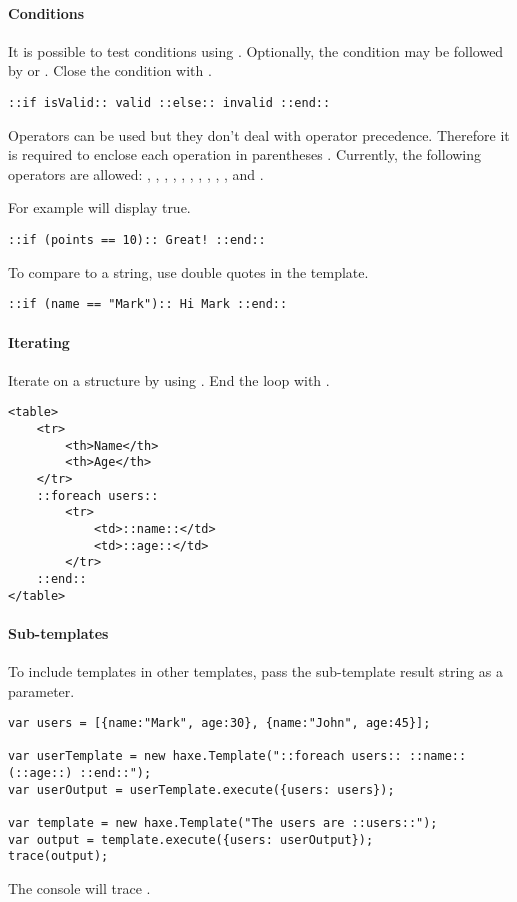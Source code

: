 \paragraph{Conditions}
It is possible to test conditions using . Optionally, the condition may be followed by  or . Close the condition with .

\begin{lstlisting} 
::if isValid:: valid ::else:: invalid ::end::
\end{lstlisting} 

Operators can be used but they don't deal with operator precedence. Therefore it is required to enclose each operation in parentheses \ic{()}. Currently, the following operators are allowed: \ic{+}, \ic{-}, \ic{*}, \ic{/}, \ic{>}, \ic{<},  \ic{>=}, \ic{<=}, \ic{==}, \ic{!=}, \ic{\&\&} and \ic{||}.

For example  will display true. 

\begin{lstlisting} 
::if (points == 10):: Great! ::end::
\end{lstlisting} 

To compare to a string, use double quotes  in the template.
\begin{lstlisting} 
::if (name == "Mark"):: Hi Mark ::end::
\end{lstlisting} 

\paragraph{Iterating}
Iterate on a structure by using . End the loop with .
\begin{lstlisting} 
<table>
	<tr>
		<th>Name</th>
		<th>Age</th>
	</tr>
	::foreach users::
		<tr>
			<td>::name::</td>
			<td>::age::</td>
		</tr>
	::end::
</table>
\end{lstlisting} 

\paragraph{Sub-templates}
To include templates in other templates, pass the sub-template result string as a parameter.
\begin{lstlisting} 
var users = [{name:"Mark", age:30}, {name:"John", age:45}];

var userTemplate = new haxe.Template("::foreach users:: ::name::(::age::) ::end::");
var userOutput = userTemplate.execute({users: users});

var template = new haxe.Template("The users are ::users::");
var output = template.execute({users: userOutput});
trace(output);
\end{lstlisting} 
The console will trace .

